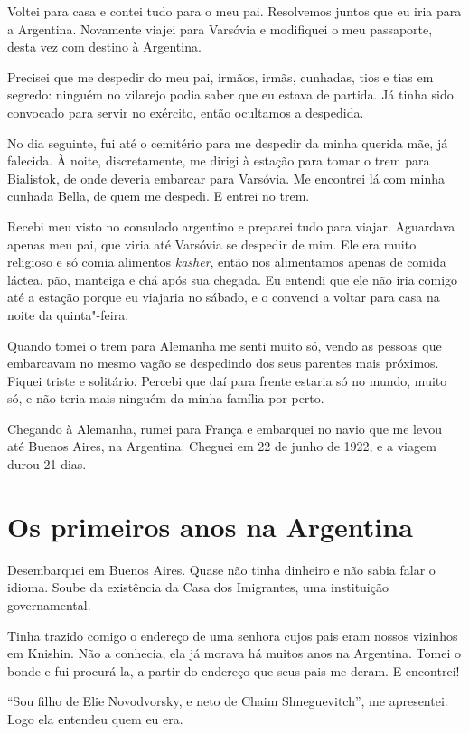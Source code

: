 Voltei para casa e contei tudo para o meu pai. Resolvemos juntos que eu
iria para a Argentina. Novamente viajei para Varsóvia e
modifiquei o meu passaporte, desta vez com destino à Argentina.

Precisei que me despedir do meu pai, irmãos, irmãs, cunhadas, tios e tias em
segredo: ninguém no vilarejo podia saber que eu estava de partida. Já tinha 
sido convocado para servir no exército, então ocultamos a despedida.

No dia seguinte, fui até o cemitério para me despedir da minha querida
mãe, já falecida. À noite, discretamente, me dirigi à estação para
tomar o trem para Bialistok, de onde deveria embarcar para Varsóvia. Me encontrei lá 
com minha cunhada Bella, de quem me despedi. E entrei no trem.

Recebi meu visto no consulado argentino e preparei tudo para
viajar. Aguardava apenas meu pai, que viria até Varsóvia se despedir de mim.
Ele era muito religioso e só comia alimentos \textit{kasher}, então nos
alimentamos apenas de comida láctea, pão,
manteiga e chá após sua chegada. Eu entendi que ele não iria comigo até a estação porque
eu viajaria no sábado, e o convenci a voltar para casa na
noite da quinta"-feira. 

Quando tomei o trem para Alemanha me senti muito só, vendo as pessoas que embarcavam no mesmo vagão se despedindo
dos seus parentes mais próximos. Fiquei triste e solitário. Percebi que daí para frente estaria
só no mundo, muito só, e não teria mais ninguém da minha família por perto.

Chegando à Alemanha, rumei para França e embarquei no navio que me
levou até Buenos Aires, na Argentina. Cheguei em 22 de junho de 1922, e a viagem durou 21 dias.

\chapter{Os primeiros anos na Argentina}

Desembarquei em Buenos Aires. Quase não tinha dinheiro e não sabia falar
o idioma. Soube da existência da Casa dos Imigrantes, uma instituição governamental.

Tinha trazido comigo o endereço de uma senhora cujos pais eram nossos
vizinhos em Knishin. Não a conhecia, ela já morava há muitos anos
na Argentina. Tomei o bonde e fui procurá-la, a partir do endereço que seus pais me deram. E encontrei!

``Sou filho de Elie Novodvorsky, e neto de Chaim Shneguevitch'', me
apresentei. Logo ela entendeu quem eu era.

